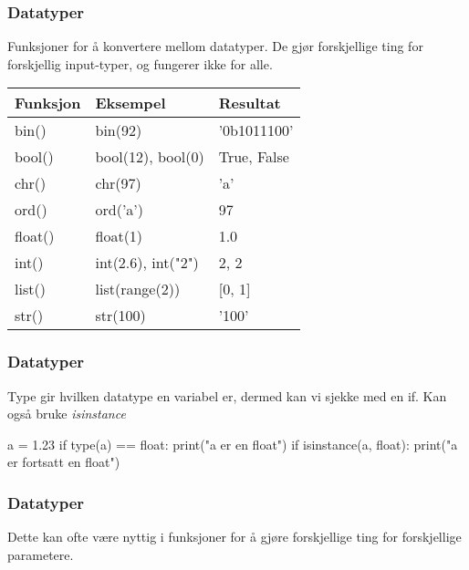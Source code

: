 \begin{frame}
    \frametitle{Datatyper}

    Funksjoner for å konvertere mellom datatyper. De gjør forskjellige ting for forskjellig input-typer, og fungerer ikke for alle. 

    \begin{table}[]
        \begin{tabular}{|l|l|l|}
        \hline
        Funksjon & Eksempel           & Resultat    \\ \hline
        bin()    & bin(92)            & '0b1011100' \\ \hline
        bool()   & bool(12), bool(0)  & True, False \\ \hline
        chr()    & chr(97)            & 'a'         \\ \hline
        ord()    & ord('a')           & 97          \\ \hline
        float()  & float(1)           & 1.0         \\ \hline
        int()    & int(2.6), int("2") & 2, 2        \\ \hline
        list()   & list(range(2))     & {[}0, 1{]}  \\ \hline
        str()    & str(100)           & '100'       \\ \hline
        \end{tabular}
    \end{table}

\end{frame}

\begin{frame}[fragile]
    \frametitle{Datatyper}

    Type gir hvilken datatype en variabel er, dermed kan vi sjekke med en if. Kan også bruke \textit{isinstance}

\begin{python}
a = 1.23
if type(a) == float:
    print("a er en float")
if isinstance(a, float):
    print("a er fortsatt en float")
\end{python}

\end{frame}

\begin{frame}
    \frametitle{Datatyper}

    Dette kan ofte være nyttig i funksjoner for å gjøre forskjellige ting for forskjellige parametere. 

\end{frame}
